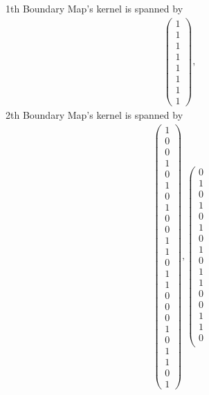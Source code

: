 \documentclass[8pt]{article}
\begin{document}
\centering
1th Boundary Map's kernel is spanned by
 \begin{align*} \left(\begin{array}{r}
1 \\
1 \\
1 \\
1 \\
1 \\
1 \\
1 \\
1
\end{array}\right) ,
 \end{align*}
 2th Boundary Map's kernel is spanned by
 \begin{align*} \left(\begin{array}{r}
1 \\
0 \\
0 \\
1 \\
0 \\
1 \\
0 \\
1 \\
0 \\
0 \\
1 \\
1 \\
0 \\
1 \\
1 \\
0 \\
0 \\
0 \\
1 \\
0 \\
1 \\
1 \\
0 \\
1
\end{array}\right) ,
 \left(\begin{array}{r}
0 \\
1 \\
0 \\
1 \\
0 \\
1 \\
0 \\
1 \\
0 \\
1 \\
1 \\
0 \\
0 \\
1 \\
1 \\
0 \\

\end{array}
\end{align*}
\end{document}
